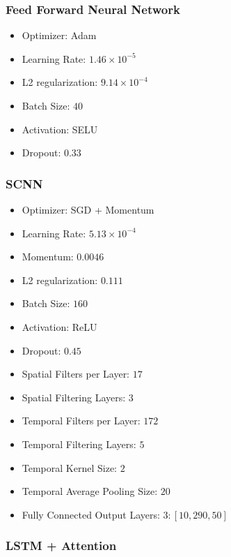 \subsubsection{Feed Forward Neural Network}

\begin{itemize}
\item Optimizer: Adam
\item Learning Rate: $1.46 \times 10^{-5}$
\item L2 regularization: $9.14 \times 10^{-4}$
\item Batch Size: $40$
\item Activation: SELU
\item Dropout: $0.33$
\end{itemize}

\subsubsection{SCNN}

\begin{itemize}
\item Optimizer: SGD + Momentum
\item Learning Rate: $5.13 \times 10^{-4}$
\item Momentum: $0.0046$
\item L2 regularization: $0.111$
\item Batch Size: $160$
\item Activation: ReLU
\item Dropout: $0.45$
\item Spatial Filters per Layer: $17$
\item Spatial Filtering Layers: $3$
\item Temporal Filters per Layer: $172$
\item Temporal Filtering Layers: $5$
\item Temporal Kernel Size: $2$
\item Temporal Average Pooling Size: $20$
\item Fully Connected Output Layers: $3: [10, 290, 50]$
\end{itemize}

\subsubsection{LSTM + Attention}

